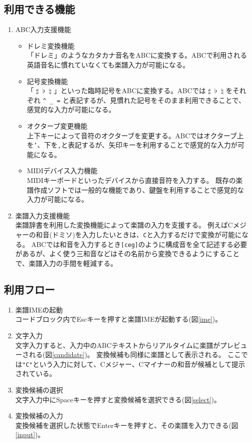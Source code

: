\subsection{利用できる機能}
\begin{enumerate}
    \item ABC入力支援機能
    \begin{itemize}
        \item ドレミ変換機能\\
        「ドレミ」のようなカタカナ音名をABCに変換する。ABCで利用される英語音名に慣れていなくても楽譜入力が可能になる。
        \item 記号変換機能\\
        「 $\sharp\;\;\flat\;\;\natural$ 」といった臨時記号をABCに変換する。ABCでは $\sharp\;\;\flat\;\;\natural$ をそれぞれ \verb|^ _ =| と表記するが、見慣れた記号をそのまま利用できることで、感覚的な入力が可能になる。
        \item オクターブ変更機能\\
        上下キーによって音符のオクターブを変更する。ABCではオクターブ上を\texttt{'}、下を\texttt{,}と表記するが、矢印キーを利用することで感覚的な入力が可能になる。
        \item MIDIデバイス入力機能\\
        MIDIキーボードといったデバイスから直接音符を入力する。
        既存の楽譜作成ソフトでは一般的な機能であり、鍵盤を利用することで感覚的な入力が可能になる。
    \end{itemize}
    \item 楽譜入力支援機能\\
    楽譜辞書を利用した変換機能によって楽譜の入力を支援する。
    例えばCメジャーの和音(ドミソ)を入力したいときは、\texttt{C}と入力するだけで変換が可能になる。
    ABCでは和音を入力するとき\texttt{[ceg]}のように構成音を全て記述する必要があるが、よく使う三和音などはその名前から変換できるようにすることで、楽譜入力の手間を軽減する。
\end{enumerate}

\subsection{利用フロー}
\begin{enumerate}
    \item 楽譜IMEの起動\\
    コードブロック内で\mbox{Esc}キーを押すと楽譜IMEが起動する(図\ref{ime})。
    \item 文字入力\\
    文字入力すると、入力中のABCテキストからリアルタイムに楽譜がプレビューされる(図\ref{candidate})。
    変換候補も同様に楽譜として表示される。
    ここでは\texttt{"C"}という入力に対して、Cメジャー、Cマイナーの和音が候補として提示されている。
    \item 変換候補の選択\\
    文字入力中にSpaceキーを押すと変換候補を選択できる(図\ref{select})。
    \item 変換候補の入力\\
    変換候補を選択した状態でEnterキーを押すと、その楽譜を入力できる(図\ref{input})。
\end{enumerate}

